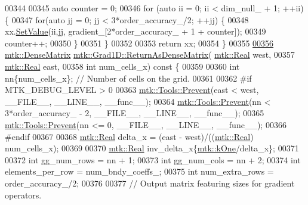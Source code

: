 \begin{DoxyCode}
{{00344 
00345   \textcolor{keyword}{auto} counter = 0;
00346   \textcolor{keywordflow}{for} (\textcolor{keyword}{auto} ii = 0; ii < dim\_null\_ + 1; ++ii) \{
00347     \textcolor{keywordflow}{for}(\textcolor{keyword}{auto} jj = 0; jj < 3*order\_accuracy\_/2; ++jj) \{
00348       xx.\hyperlink{classmtk_1_1DenseMatrix_a784ce5784109ac86bfb9d8562b334b13}{SetValue}(ii,jj, gradient\_[2*order\_accuracy\_ + 1 + counter]);
00349       counter++;
00350     \}
00351   \}
00352 
00353   \textcolor{keywordflow}{return} xx;
00354 \}
00355 
\hypertarget{mtk__grad__1d_8cc_source_l00356}{}\hyperlink{classmtk_1_1Grad1D_a77b2eddbe4ab03f469306c604d505b1a}{00356} \hyperlink{classmtk_1_1DenseMatrix}{mtk::DenseMatrix} \hyperlink{classmtk_1_1Grad1D_a77b2eddbe4ab03f469306c604d505b1a}{mtk::Grad1D::ReturnAsDenseMatrix}(
      \hyperlink{group__c01-roots_gac080bbbf5cbb5502c9f00405f894857d}{mtk::Real} west,
00357                                                   \hyperlink{group__c01-roots_gac080bbbf5cbb5502c9f00405f894857d}{mtk::Real} east,
00358                                                   \textcolor{keywordtype}{int} num\_cells\_x)\textcolor{keyword}{ const }\{
00359 
00360   \textcolor{keywordtype}{int} nn\{num\_cells\_x\}; \textcolor{comment}{// Number of cells on the grid.}
00361 
00362 \textcolor{preprocessor}{  #if MTK\_DEBUG\_LEVEL > 0}
00363   \hyperlink{classmtk_1_1Tools_a332324c6f25e66be9dff48c5987a3b9f}{mtk::Tools::Prevent}(east < west, \_\_FILE\_\_, \_\_LINE\_\_, \_\_func\_\_);
00364   \hyperlink{classmtk_1_1Tools_a332324c6f25e66be9dff48c5987a3b9f}{mtk::Tools::Prevent}(nn < 3*order\_accuracy\_ - 2, \_\_FILE\_\_, \_\_LINE\_\_, \_\_func\_\_);
00365   \hyperlink{classmtk_1_1Tools_a332324c6f25e66be9dff48c5987a3b9f}{mtk::Tools::Prevent}(nn <= 0, \_\_FILE\_\_, \_\_LINE\_\_, \_\_func\_\_);
00366 \textcolor{preprocessor}{  #endif}
00367 
00368   \hyperlink{group__c01-roots_gac080bbbf5cbb5502c9f00405f894857d}{mtk::Real} delta\_x = (east - west)/((\hyperlink{group__c01-roots_gac080bbbf5cbb5502c9f00405f894857d}{mtk::Real}) num\_cells\_x);
00369 
00370   \hyperlink{group__c01-roots_gac080bbbf5cbb5502c9f00405f894857d}{mtk::Real} inv\_delta\_x\{\hyperlink{group__c01-roots_ga26407c24d43b6b95480943340d285c71}{mtk::kOne}/delta\_x\};
00371 
00372   \textcolor{keywordtype}{int} gg\_num\_rows = nn + 1;
00373   \textcolor{keywordtype}{int} gg\_num\_cols = nn + 2;
00374   \textcolor{keywordtype}{int} elements\_per\_row = num\_bndy\_coeffs\_;
00375   \textcolor{keywordtype}{int} num\_extra\_rows = order\_accuracy\_/2;
00376 
00377   \textcolor{comment}{// Output matrix featuring sizes for gradient operators.}
}}
\end{DoxyCode}
